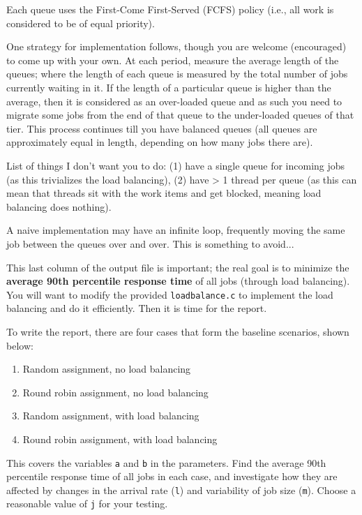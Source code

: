 \documentclass[letterpaper,10pt]{article}
\begin{document}
Each queue uses the First-Come First-Served (FCFS) policy (i.e., all work is considered to be of equal priority).

One strategy for implementation follows, though you are welcome (encouraged) to come up with your own. At each period, measure the average length of the queues; where the length of each queue is measured by the total number of jobs currently waiting in it. If the length of a particular queue is higher than the average, then it is considered as an over-loaded queue and as such you need to migrate some jobs from the end of that queue to the under-loaded queues of that tier. This process continues till you have balanced queues (all queues are approximately equal in length, depending on how many jobs there are).

List of things I don't want you to do: (1) have a single queue for incoming jobs (as this trivializes the load balancing), (2) have > 1 thread per queue (as this can mean that threads sit with the work items and get blocked, meaning load balancing does nothing).

A naive implementation may have an infinite loop, frequently moving the same job between the queues over and over. This is something to avoid...

This last column of the output file is important; the real goal is to minimize the \textbf{average 90th percentile response time} of all jobs (through load balancing). You will want to modify the provided \texttt{loadbalance.c} to implement the load balancing and do it efficiently. Then it is time for the report.

To write the report, there are four cases that form the baseline scenarios, shown below: 

\begin{enumerate}
	\item Random assignment, no load balancing
	\item Round robin assignment, no load balancing
	\item Random assignment, with load balancing
	\item Round robin assignment, with load balancing
\end{enumerate}

This covers the variables \texttt{a} and \texttt{b} in the parameters. Find the average 90th percentile response time of all jobs in each case, and investigate how they are affected by changes in the arrival rate (\texttt{l}) and variability of job size (\texttt{m}). Choose a reasonable value of \texttt{j} for your testing.
\end{document}
